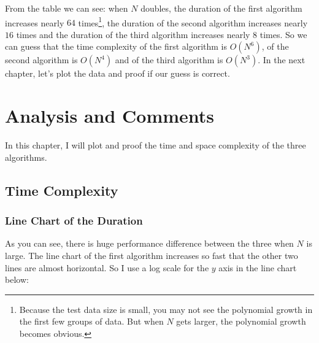 \documentclass[a4paper,oneside]{book}
\begin{document}
From the table we can see: when $N$ doubles, the duration of the first algorithm
increases nearly $64$ times\footnote{Because the test data size is small, you
may not see the polynomial growth in the first few groups of data. But when $N$
gets larger, the polynomial growth becomes obvious. }, the duration of the
second algorithm increases nearly $16$ times and the duration of the third
algorithm increases nearly $8$ times. So we can guess that the time complexity
of the first algorithm is $O(N^6)$, of the second algorithm is $O(N^4)$ and of
the third algorithm is $O(N^3)$. In the next chapter, let's plot the data and
proof if our guess is correct.

\chapter{Analysis and Comments}

In this chapter, I will plot and proof the time and space complexity of the
three algorithms.

\section{Time Complexity}

\subsection{Line Chart of the Duration}

As you can see, there is huge performance difference between the three
when $N$ is large. The line chart of the first algorithm increases so fast
that the other two lines are almost horizontal. So I use a log scale for the
$y$ axis in the line chart below:
\end{document}
